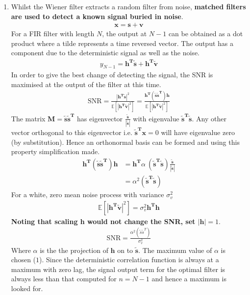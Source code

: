 \documentclass[a4paper]{article}
\newcommand{\ix}[1]{%
  \leavevmode %
  \marginpar{\small\emph{#1}}%
}
\newcommand{\vect}[1]{\boldsymbol{\mathbf{#1}}}
\begin{document}
\begin{enumerate}
\item\ix{Matched Filters}Whilst the Wiener filter extracts a random filter from noise, \textbf{matched filters are used to detect a known signal buried in noise}.
\begin{align*}
\vect{x = s + v} 
\end{align*}
For a FIR filter with length $N$, the output at $N-1$ can be obtained as a dot product where a tilde represents a time reversed vector. The output has a component due to the deterministic signal as well as the noise. 
\begin{align*}
y_{N-1} = \vect{h^T \tilde{s} + h^T \tilde{v}}
\end{align*}
In order to give the best change of detecting the signal, the SNR is maximised at the output of the filter at this time. 
\begin{align*}
\text{SNR} = \frac{|\vect{h^T \tilde{s}}|^2}{\mathbb{E}[|\vect{h^T \tilde{v}}|^2]} = \frac{\vect{h^T (\tilde{s}\tilde{s}^T) h}}{\mathbb{E}[|\vect{h^T \tilde{v}}|^2]} 
\end{align*}
The matrix $\vect{M = \tilde{s}\tilde{s}^T}$ has eigenvector $\vect{\frac{\tilde{s}}{|\tilde{s}|}}$ with eigenvalue $\vect{\tilde{s}^T\tilde{s}}$. Any other vector orthogonal to this eigenvector i.e. $\vect{\tilde{s}^Tx}=0$ will have eigenvalue zero (by substitution). Hence an orthonormal basis can be formed and using this property simplification made.
\begin{align*}
\vect{h^T (\tilde{s}\tilde{s}^T) h} &= \vect{h^T} \alpha\  (\vect{\tilde{s}^T\tilde{s}}) \frac{\vect{\tilde{s}}}{|\vect{\tilde{s}}|} \\
&= \alpha^2 (\vect{\tilde{s}^T\tilde{s}})
\end{align*}
For a white, zero mean noise process with variance $\sigma_v^2$
\begin{align*}
\mathbb{E}[|\vect{h^T \tilde{v}}|^2] = \sigma_v^2 \vect{h^Th}
\end{align*}
\textbf{Noting that scaling h would not change the SNR, set $|\vect{h}|=1$}. 
\begin{align*}
\text{SNR} = \frac{\alpha^2 (\tilde{s}\tilde{s}^T)}{\sigma_v^2}
\end{align*}
Where $\alpha$ is the the projection of $\vect{h}$ on to $\vect{\tilde{s}}$. The maximum value of $\alpha$ is chosen ($1$). Since the deterministic correlation function is always at a maximum with zero lag, the signal output term for the optimal filter is always less than that computed for $n = N-1$ and hence a maximum is looked for. 


\end{enumerate}
\end{document}

